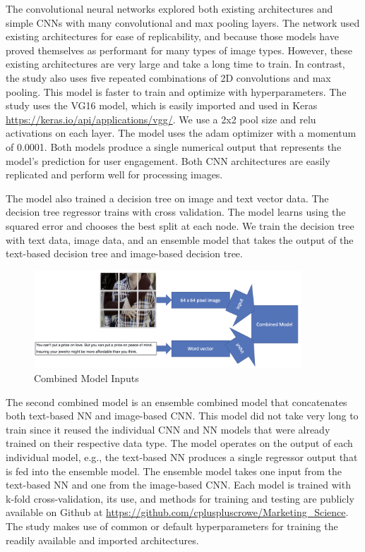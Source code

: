 \documentclass[mksc,blindrev]{informs3} %
\begin{document}
The convolutional neural networks explored both existing architectures and simple CNNs with many convolutional and max pooling layers. The network used existing architectures for ease of replicability, and because those models have proved themselves as performant for many types of image types. However, these existing architectures are very large and take a long time to train. In contrast, the study also uses five repeated combinations of 2D convolutions and max pooling. This model is faster to train and optimize with hyperparameters. The study uses the VG16 model, which is easily imported and used in Keras \url{https://keras.io/api/applications/vgg/}. We use a 2x2 pool size and relu activations on each layer. The model uses the adam optimizer with a momentum of 0.0001. Both models produce a single numerical output that represents the model's prediction for user engagement. Both CNN architectures are easily replicated and perform well for processing images.

The model also trained a decision tree on image and text vector data. The decision tree regressor trains with cross validation. The model learns using the squared error and chooses the best split at each node. We train the decision tree with text data, image data, and an ensemble model that takes the output of the text-based decision tree and image-based decision tree. 

\begin{figure}
\centering
\includegraphics[width=10cm]{images/Combined_Model_Features.png}
\caption{Combined Model Inputs}
\label{fig:lion}
\end{figure}

The second combined model is an ensemble combined model that concatenates both text-based NN and image-based CNN. This model did not take very long to train since it reused the individual CNN and NN models that were already trained on their respective data type. The model operates on the output of each individual model, e.g., the text-based NN produces a single regressor output that is fed into the ensemble model. The ensemble model takes one input from the text-based NN and one from the image-based CNN. Each model is trained with k-fold cross-validation, its use, and methods for training and testing are publicly available on Github at \url{https://github.com/cpluspluscrowe/Marketing_Science}. The study makes use of common or default hyperparameters for training the readily available and imported architectures.
\end{document}
